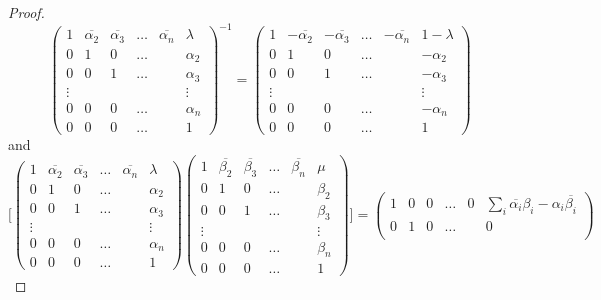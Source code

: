 \documentclass{article}
\theoremstyle{definition}
\begin{document}
\begin{proof}
		$$\begin{pmatrix}
			1 & \overline{\alpha_2} & \overline{\alpha_3} & \ldots & \overline{\alpha_n} & \lambda \\
			0 & 1 & 0 & \ldots & & \alpha_2 \\
			0 & 0 & 1 & \ldots & & \alpha_3 \\
			\vdots & & & & & \vdots \\
			0 & 0 & 0 & \ldots & & \alpha_n \\
			0 & 0 & 0 & \ldots & & 1
		\end{pmatrix}^{-1} =  \begin{pmatrix}
			1 & -\overline{\alpha_2} & -\overline{\alpha_3} & \ldots & -\overline{\alpha_n} & 1-\lambda \\
			0 & 1 & 0 & \ldots & & -\alpha_2 \\
			0 & 0 & 1 & \ldots & & -\alpha_3 \\
			\vdots & & & & & \vdots \\
			0 & 0 & 0 & \ldots & & -\alpha_n \\
			0 & 0 & 0 & \ldots & & 1
		\end{pmatrix}$$
		and 
		$$\Big[ \begin{pmatrix}
			1 & \overline{\alpha_2} & \overline{\alpha_3} & \ldots & \overline{\alpha_n} & \lambda \\
			0 & 1 & 0 & \ldots & & \alpha_2 \\
			0 & 0 & 1 & \ldots & & \alpha_3 \\
			\vdots & & & & & \vdots \\
			0 & 0 & 0 & \ldots & & \alpha_n \\
			0 & 0 & 0 & \ldots & & 1
		\end{pmatrix} 
		\begin{pmatrix}
			1 & \overline{\beta_2} & \overline{\beta_3} & \ldots & \overline{\beta_n} & \mu \\
			0 & 1 & 0 & \ldots & & \beta_2 \\
			0 & 0 & 1 & \ldots & & \beta_3 \\
			\vdots & & & & & \vdots \\
			0 & 0 & 0 & \ldots & & \beta_n \\
			0 & 0 & 0 & \ldots & & 1
		\end{pmatrix} \Big] = \begin{pmatrix}
			1 & 0 & 0 & \ldots & 0 & \sum_i \overline{\alpha_i}\beta_i - \alpha_i \overline{\beta_i} \\
			0 & 1 & 0 & \ldots & & 0 \\

\end{pmatrix}$$
\end{proof}
\end{document}
